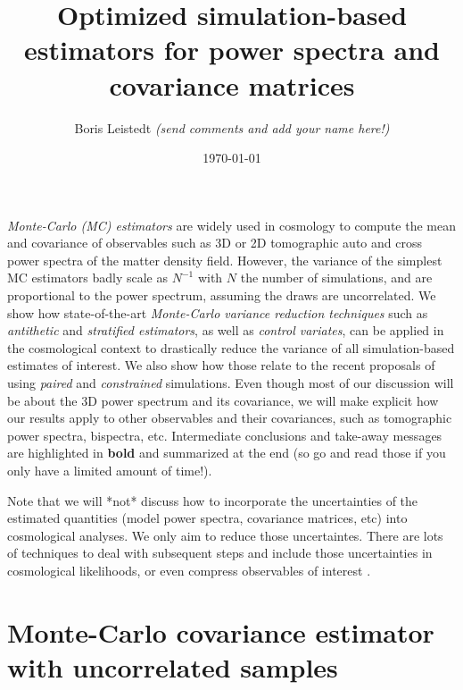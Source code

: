 \documentclass{aastex6}
\newcommand{\eg}{{\textit{e.g.,}~}}
\begin{document}
 
\title{Optimized simulation-based estimators for power spectra and covariance matrices} 
\author{Boris Leistedt \textit{(send comments and add your name here!)}}
\date{\today}
\maketitle

\vspace*{-3mm}




\textit{Monte-Carlo (MC) estimators} are widely used in cosmology to compute the mean and covariance of observables such as 3D or 2D tomographic auto and cross power spectra of the matter density field.
However, the variance of the simplest MC estimators badly scale as $N^{-1}$ with $N$ the number of simulations, and are proportional to the power spectrum, assuming the draws are uncorrelated.
We show how state-of-the-art \textit{Monte-Carlo variance reduction techniques} such as \textit{antithetic} and \textit{stratified estimators}, as well as \textit{control variates}, can be applied in the cosmological context to drastically reduce the variance of all simulation-based estimates of interest.
We also show how those relate to the recent proposals of using  \textit{paired} and \textit{constrained} simulations.
Even though most of our discussion will be about the 3D power spectrum and its covariance, we will make explicit how our results apply to other observables and their covariances, such as tomographic power spectra, bispectra, etc.
Intermediate conclusions and take-away messages are highlighted in \textbf{bold} and summarized at the end (so go and read those if you only have a limited amount of time!).

Note that we will *not* discuss how to incorporate the uncertainties of the estimated quantities (model power spectra, covariance matrices, etc) into cosmological analyses. We only aim to reduce those uncertaintes. There are lots of techniques to deal with subsequent steps and include those uncertainties in cosmological likelihoods, or even compress observables of interest \citep[\eg][]{SellentinHeavens2015, FriedrichEifler2017, Heavensetal2017}. 

\section{Monte-Carlo covariance estimator with uncorrelated samples}
\end{document}

